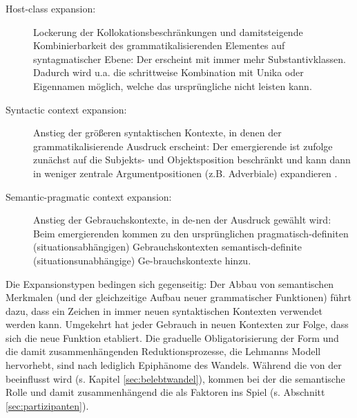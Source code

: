 \begin{description}
\item[Host-class expansion:] Lockerung der Kollokationsbeschränkungen und damit\linebreak steigende Kombinierbarkeit des grammatikalisierenden Elementes auf syntagmatischer Ebene: Der  erscheint mit immer mehr Substantivklassen. Dadurch wird u.a. die schrittweise Kombination mit Unika  oder Eigennamen  möglich, welche das ursprüngliche  nicht leisten kann. 
\item[Syntactic context expansion:] Anstieg  der größeren syntaktischen Kontexte, in denen der grammatikalisierende Ausdruck erscheint: Der emergierende  ist \textcite[32]{Himmelmann2004} zufolge zunächst auf die Subjekts- und Objektsposition   beschränkt und kann dann in weniger zentrale Argumentpositionen (z.B. Adverbiale)  expandieren  \parencite[s. hierzu auch ausführlich][]{Himmelmann1998}. 
\item[Semantic-pragmatic context expansion:] Anstieg  der Gebrauchskontexte, in de-\linebreak nen der Ausdruck gewählt wird: Beim emergierenden  kommen zu den ursprünglichen pragmatisch-definiten (situationsabhängigen) Gebrauchskontexten semantisch-definite (situationsunabhängige) Ge-\linebreak brauchskontexte hinzu.   

 
\end{description}

\noindent
Die Expansionstypen  bedingen sich gegenseitig: Der Abbau von semantischen Merkmalen (und der gleichzeitige Aufbau neuer grammatischer Funktionen) führt dazu, dass ein Zeichen in immer neuen syntaktischen Kontexten verwendet werden kann. Umgekehrt hat jeder Gebrauch in neuen Kontexten zur Folge, dass sich die neue Funktion etabliert. Die graduelle Obligatorisierung der Form und die damit zusammenhängenden Reduktionsprozesse, die Lehmanns Modell hervorhebt, sind nach \textcite[33]{Himmelmann2004} lediglich Epiphänome des Wandels. Während die   von der   beeinflusst wird (s. Kapitel \ref{sec:belebtwandel}), kommen bei der   die semantische Rolle  und damit zusammenhängend die  als Faktoren ins Spiel (s. Abschnitt \ref{sec:partizipanten}).

